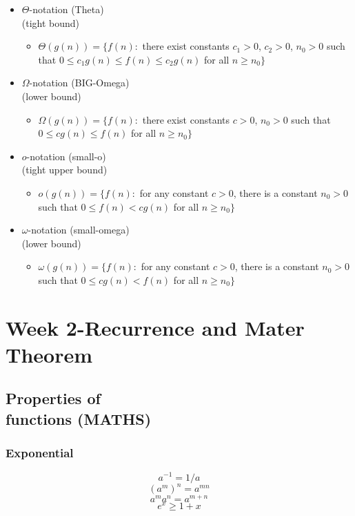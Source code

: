 \documentclass{article}
\begin{document}
\begin{multicols*}{4}
\begin{itemize}
\item $\Theta$-notation (Theta)\\(tight bound)
	\begin{itemize}
	\item $\Theta (g(n))=\{f(n):$ there exist constants $c_1 > 0$, $c_2 > 0$, $n_0 > 0$ such that $0 \leq c_1 g(n) \leq f(n) \leq c_2 g(n)$ for all $n \geq n_0\}$
	\end{itemize}
	
\item $\Omega$-notation (BIG-Omega)\\(lower bound)
	\begin{itemize}
	\item $\Omega (g(n))=\{f(n):$ there exist constants $c > 0$, $n_0 > 0$ such that $0 \leq cg(n) \leq f(n)$ for all $n \geq n_0\}$
	\end{itemize}

\item $o$-notation (small-o)\\(tight upper bound)
	\begin{itemize}
	\item $o(g(n))=\{f(n):$ for any constant $c > 0$, there is a constant $n_0 > 0$ such that $0 \leq f(n) < cg(n)$ for all $n \geq n_0\}$
	\end{itemize}
	
\item $\omega$-notation (small-omega)\\(lower bound)
	\begin{itemize}
	\item $\omega (g(n))=\{f(n):$ for any constant $c > 0$, there is a constant $n_0 > 0$ such that $0 \leq cg(n) < f(n)$ for all $n \geq n_0\}$
	\end{itemize}
\end{itemize}


\section{Week 2-Recurrence and Mater Theorem}

\subsection{Properties of\\functions (MATHS)}
\subsubsection{Exponential}
\begin{displaymath}
a^{-1} = 1/a
\end{displaymath}
\begin{displaymath}
(a^m)^n = a^{mn}
\end{displaymath}
\begin{displaymath}
a^m a^n = a^{m+n}
\end{displaymath}
\begin{displaymath}
e^x \geq 1+x
\end{displaymath}

\end{multicols*}
\end{document}

